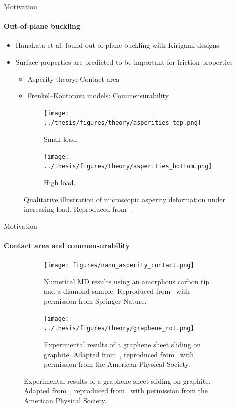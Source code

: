 \documentclass[
	10pt, %
]{beamer}
\begin{document}
\begin{frame}{Motivation}
	\framesubtitle{Out-of-plane buckling}
	\vspace{0.5cm}
	
	\begin{itemize}
		\item Hanakata et al. \cite{Hanakata_2018,Hanakata_2020} found out-of-plane buckling with Kirigami designs
		\item Surface properties are predicted to be important for friction properties
		\begin{itemize}
			\item Asperity theory: Contact area
			\item Frenkel–Kontorova models: Commensurability
		\end{itemize}
	\end{itemize}

	\begin{figure}[H]
		\centering
		\begin{subfigure}[b]{0.49\textwidth}
			\centering
			\texttt{[image: ../thesis/figures/theory/asperities\_top.png]}
			\caption{Small load.}
			\label{fig:asp_left}
		\end{subfigure}
		\hfill
		\begin{subfigure}[b]{0.49\textwidth}
			\centering
			\texttt{[image: ../thesis/figures/theory/asperities\_bottom.png]}
			\caption{High load.}
			\label{fig:asp_right}
		\end{subfigure}
		\caption{Qualitative illustration of microscopic asperity deformation under increasing load. Reproduced from~\cite{wiki:asperities}.}
	\end{figure}
\end{frame}
%
%
\begin{frame}{Motivation}
\framesubtitle{Contact area and commensurability}
\begin{figure}[H]
	\centering
	\begin{subfigure}[b]{0.46\textwidth}
		\centering
		\texttt{[image: figures/nano\_asperity\_contact.png]}
		\caption{Numerical MD results using an amorphous carbon tip and a diamond sample. Reproduced from~\cite{mo_friction_2009} with permission from Springer Nature.}
	\end{subfigure}
	\hfill
	\begin{subfigure}[b]{0.49\textwidth}
		\centering
		\texttt{[image: ../thesis/figures/theory/graphene\_rot.png]}
		\caption{Experimental results of a graphene sheet sliding on graphite. Adapted from~\cite{DIENWIEBEL2005197}, reproduced from~\cite{Vanossi_2013} with permission from the American Physical Society.}
	\end{subfigure}
\end{figure}
\end{frame}
%
%
\end{document}
